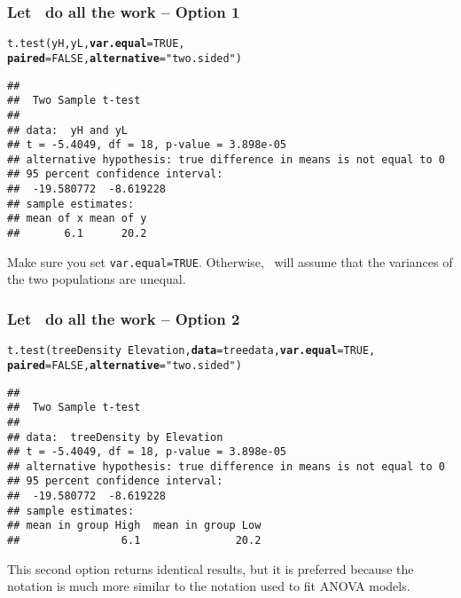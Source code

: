 \documentclass[color=usenames,dvipsnames]{beamer}\usepackage[]{graphicx}\usepackage[]{color}
\makeatletter
\newcommand{\hlnum}[1]{\textcolor[rgb]{0.69,0.494,0}{#1}}%
\newcommand{\hlstr}[1]{\textcolor[rgb]{0.749,0.012,0.012}{#1}}%
\newcommand{\hlopt}[1]{\textcolor[rgb]{0,0,0}{#1}}%
\newcommand{\hlstd}[1]{\textcolor[rgb]{0,0,0}{#1}}%
\newcommand{\hlkwc}[1]{\textcolor[rgb]{0,0,0}{\textbf{#1}}}%
\newcommand{\hlkwd}[1]{\textcolor[rgb]{0.004,0.004,0.506}{#1}}%
\newenvironment{kframe}{%
 \def\at@end@of@kframe{}%
 \ifinner\ifhmode%
  \def\at@end@of@kframe{\end{minipage}}%
  \begin{minipage}{\columnwidth}%
 \fi\fi%
 \def\FrameCommand##1{\hskip\@totalleftmargin \hskip-\fboxsep
 \colorbox{shadecolor}{##1}\hskip-\fboxsep
     \hskip-\linewidth \hskip-\@totalleftmargin \hskip\columnwidth}%
 \MakeFramed {\advance\hsize-\width
   \@totalleftmargin\z@ \linewidth\hsize
   \@setminipage}}%
 {\par\unskip\endMakeFramed%
 \at@end@of@kframe}
\newenvironment{knitrout}{}{} %
\newcommand{\inr}[1]{\colorbox{inlinecolor}{\texttt{#1}}}
\makeatother
\begin{document}
\begin{frame}[fragile]
  \frametitle{Let \R~do all the work -- Option 1}
  \footnotesize
\begin{knitrout}
\color{fgcolor}\begin{kframe}
\begin{alltt}
\hlkwd{t.test}\hlstd{(yH, yL,} \hlkwc{var.equal}\hlstd{=}\hlnum{TRUE}\hlstd{,}
       \hlkwc{paired}\hlstd{=}\hlnum{FALSE}\hlstd{,} \hlkwc{alternative}\hlstd{=}\hlstr{"two.sided"}\hlstd{)}
\end{alltt}
\begin{verbatim}
## 
## 	Two Sample t-test
## 
## data:  yH and yL
## t = -5.4049, df = 18, p-value = 3.898e-05
## alternative hypothesis: true difference in means is not equal to 0
## 95 percent confidence interval:
##  -19.580772  -8.619228
## sample estimates:
## mean of x mean of y 
##       6.1      20.2
\end{verbatim}
\end{kframe}
\end{knitrout}
\vfill
{\centering %
  Make sure you set \inr{var.equal=TRUE}. Otherwise, \R~will assume
  that the variances of the two populations are unequal. \\
}
\end{frame}



\begin{frame}[fragile]
  \frametitle{Let \R~do all the work -- Option 2}
  \footnotesize
\begin{knitrout}
\color{fgcolor}\begin{kframe}
\begin{alltt}
\hlkwd{t.test}\hlstd{(treeDensity} \hlopt{~} \hlstd{Elevation,} \hlkwc{data}\hlstd{=treedata,} \hlkwc{var.equal}\hlstd{=}\hlnum{TRUE}\hlstd{,}
       \hlkwc{paired}\hlstd{=}\hlnum{FALSE}\hlstd{,} \hlkwc{alternative}\hlstd{=}\hlstr{"two.sided"}\hlstd{)}
\end{alltt}
\begin{verbatim}
## 
## 	Two Sample t-test
## 
## data:  treeDensity by Elevation
## t = -5.4049, df = 18, p-value = 3.898e-05
## alternative hypothesis: true difference in means is not equal to 0
## 95 percent confidence interval:
##  -19.580772  -8.619228
## sample estimates:
## mean in group High  mean in group Low 
##                6.1               20.2
\end{verbatim}
\end{kframe}
\end{knitrout}
\vfill
{\centering %
  This second option returns identical results, but it is preferred
  because the notation is much more similar to the notation used to
  fit ANOVA models. \\
}
\end{frame}
\end{document}
